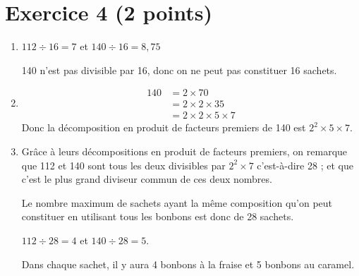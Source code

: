 \documentclass[12pt,a4paper,french]{article}
\begin{document}
\section*{Exercice 4 (2 points)}
\begin{enumerate}
	\item $112\div 16=7$ et $140\div 16 =8,75$
	
	140 n'est pas divisible par 16, donc on ne peut pas constituer 16 sachets.
	\item \begin{align*}
	140&=2\times 70\\
	&=2\times 2\times 35\\
	&=2\times 2\times 5\times 7
	\end{align*}
	Donc la décomposition en produit de facteurs premiers de 140 est $2^2\times 5\times 7$.
	\item Grâce à leurs décompositions en produit de facteurs premiers, on remarque que 112 et 140 sont tous les deux divisibles par $2^2\times 7$ c'est-à-dire 28 ; et que c'est le plus grand diviseur commun de ces deux nombres.
	
	Le nombre maximum de sachets ayant la même composition qu'on peut constituer en utilisant tous les bonbons est donc de 28 sachets.
	
	$112\div 28 =4$ et $140\div 28=5$.
	
	Dans chaque sachet, il y aura 4 bonbons à la fraise et 5 bonbons au caramel.
\end{enumerate}
\end{document}
